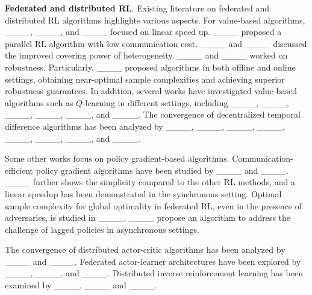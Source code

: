 \textbf{Federated and distributed RL}. Existing literature on federated and distributed RL algorithms highlights various aspects. For value-based algorithms, ____, ____, and ____ focused on  linear speed up. ____ proposed a parallel RL algorithm with low communication cost. ____ and ____ discussed the improved covering power of heterogeneity. ____ and ____ worked on robustness. Particularly, ____ proposed algorithms in both offline and online settings, obtaining near-optimal sample complexities and achieving superior robustness guarantees. In addition, several works have investigated value-based algorithms such as $Q$-learning in different settings, including ____, ____, ____, ____, ____, and ____.  The convergence of decentralized temporal difference algorithms has been analyzed by ____, ____, ____, ____, ____, ____, ____, and ____. 


Some other works focus on policy gradient-based algorithms. Communication-efficient policy gradient algorithms have been studied by ____ and ____. ____ further shows the
simplicity compared to the other RL methods, and a linear speedup has been demonstrated in the synchronous setting. Optimal sample complexity for global optimality in federated RL, even in the presence of adversaries, is studied in ____. ____ propose an algorithm to address the challenge of lagged policies in asynchronous settings.

The convergence of distributed actor-critic algorithms has been analyzed by ____ and ____. Federated actor-learner architectures have been explored by ____, ____, and ____. Distributed inverse reinforcement learning has been examined by ____, ____ and ____.
